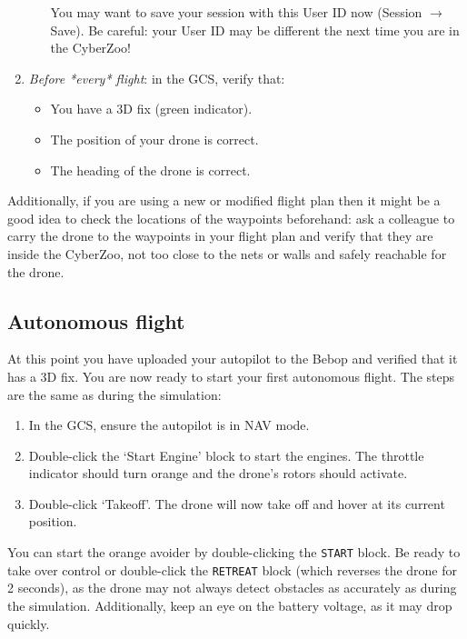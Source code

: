 \begin{enumerate}
\begin{enumerate}
		You may want to save your session with this User ID now (Session $\rightarrow$ Save). Be careful: your User ID may be different the next time you are in the CyberZoo!
	\end{enumerate}
	\item \emph{Before *every* flight}: in the GCS, verify that:
	\begin{itemize}
		\item You have a 3D fix (green indicator).
		\item The position of your drone is correct.
		\item The heading of the drone is correct.
	\end{itemize}
\end{enumerate}
	
Additionally, if you are using a new or modified flight plan then it might be a good idea to check the locations of the waypoints beforehand: ask a colleague to carry the drone to the waypoints in your flight plan and verify that they are inside the CyberZoo, not too close to the nets or walls and safely reachable for the drone.
	
\subsection*{Autonomous flight}
At this point you have uploaded your autopilot to the Bebop and verified that it has a 3D fix.
You are now ready to start your first autonomous flight.
The steps are the same as during the simulation:

\begin{enumerate}
	\item In the GCS, ensure the autopilot is in NAV mode.
	\item Double-click the `Start Engine' block to start the engines. The throttle indicator should turn orange and the drone's rotors should activate.
	\item Double-click `Takeoff'. The drone will now take off and hover at its current position.
\end{enumerate}

You can start the orange avoider by double-clicking the \texttt{START} block. Be ready to take over control or double-click the \texttt{RETREAT} block (which reverses the drone for 2 seconds), as the drone may not always detect obstacles as accurately as during the simulation. Additionally, keep an eye on the battery voltage, as it may drop quickly.

